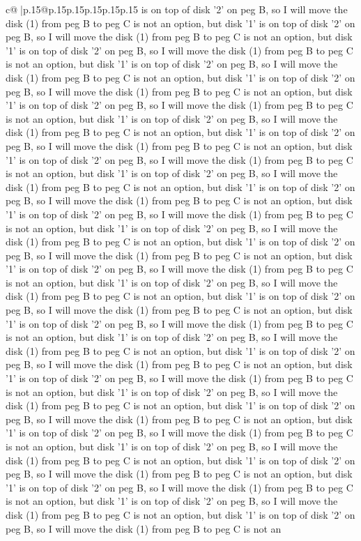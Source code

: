 \documentclass{article}
\begin{document}
{\begin{supertabular}{c@{$\;$}|p{.15\linewidth}@{}p{.15\linewidth}p{.15\linewidth}p{.15\linewidth}p{.15\linewidth}p{.15\linewidth}}
{{{is on top of disk '2' on peg B, so I will move the disk (1) from peg B to peg C is not an option, but disk '1' is on top of disk '2' on peg B, so I will move the disk (1) from peg B to peg C is not an option, but disk '1' is on top of disk '2' on peg B, so I will move the disk (1) from peg B to peg C is not an option, but disk '1' is on top of disk '2' on peg B, so I will move the disk (1) from peg B to peg C is not an option, but disk '1' is on top of disk '2' on peg B, so I will move the disk (1) from peg B to peg C is not an option, but disk '1' is on top of disk '2' on peg B, so I will move the disk (1) from peg B to peg C is not an option, but disk '1' is on top of disk '2' on peg B, so I will move the disk (1) from peg B to peg C is not an option, but disk '1' is on top of disk '2' on peg B, so I will move the disk (1) from peg B to peg C is not an option, but disk '1' is on top of disk '2' on peg B, so I will move the disk (1) from peg B to peg C is not an option, but disk '1' is on top of disk '2' on peg B, so I will move the disk (1) from peg B to peg C is not an option, but disk '1' is on top of disk '2' on peg B, so I will move the disk (1) from peg B to peg C is not an option, but disk '1' is on top of disk '2' on peg B, so I will move the disk (1) from peg B to peg C is not an option, but disk '1' is on top of disk '2' on peg B, so I will move the disk (1) from peg B to peg C is not an option, but disk '1' is on top of disk '2' on peg B, so I will move the disk (1) from peg B to peg C is not an option, but disk '1' is on top of disk '2' on peg B, so I will move the disk (1) from peg B to peg C is not an option, but disk '1' is on top of disk '2' on peg B, so I will move the disk (1) from peg B to peg C is not an option, but disk '1' is on top of disk '2' on peg B, so I will move the disk (1) from peg B to peg C is not an option, but disk '1' is on top of disk '2' on peg B, so I will move the disk (1) from peg B to peg C is not an option, but disk '1' is on top of disk '2' on peg B, so I will move the disk (1) from peg B to peg C is not an option, but disk '1' is on top of disk '2' on peg B, so I will move the disk (1) from peg B to peg C is not an option, but disk '1' is on top of disk '2' on peg B, so I will move the disk (1) from peg B to peg C is not an option, but disk '1' is on top of disk '2' on peg B, so I will move the disk (1) from peg B to peg C is not an option, but disk '1' is on top of disk '2' on peg B, so I will move the disk (1) from peg B to peg C is not an option, but disk '1' is on top of disk '2' on peg B, so I will move the disk (1) from peg B to peg C is not an option, but disk '1' is on top of disk '2' on peg B, so I will move the disk (1) from peg B to peg C is not an option, but disk '1' is on top of disk '2' on peg B, so I will move the disk (1) from peg B to peg C is not an option, but disk '1' is on top of disk '2' on peg B, so I will move the disk (1) from peg B to peg C is not an option, but disk '1' is on top of disk '2' on peg B, so I will move the disk (1) from peg B to peg C is not an option, but disk '1' is on top of disk '2' on peg B, so I will move the disk (1) from peg B to peg C is not an }}}
\end{supertabular}}
\end{document}
